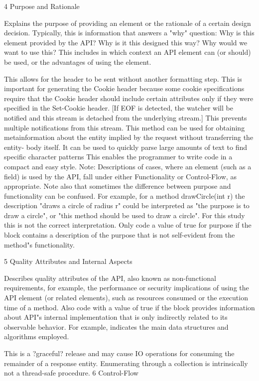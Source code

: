 4 Purpose and Rationale

Explains the purpose of providing an element or the rationale of a certain design decision. Typically, this is information that answers a "why" question: Why is this element provided by the API? Why is it this designed this way? Why would we want to use this? This includes in which context an API element can (or should) be used, or the advantages of using the element.

This allows for the header to be sent without another formatting step.
This is important for generating the Cookie header because some cookie specifications require that the Cookie header should include certain attributes only if they were specified in the Set-Cookie header.
[If EOF is detected, the watcher will be notified and this stream is detached from the underlying stream.] This prevents multiple notifications from this stream.
This method can be used for obtaining metainformation about the entity implied by the request without transferring the entity- body itself.
It can be used to quickly parse large amounts of text to find specific character patterns
This enables the programmer to write code in a compact and easy style.
Note: Descriptions of cases, where an element (such as a field) is used by the API, fall under either Functionality or Control-Flow, as appropriate. Note also that sometimes the difference between purpose and functionality can be confused. For example, for a method drawCircle(int r) the description "draws a circle of radius r" could be interpreted as "the purpose is to draw a circle", or "this method should be used to draw a circle". For this study this is not the correct interpretation. Only code a value of true for purpose if the block contains a description of the purpose that is not self-evident from the method"s functionality.

5 Quality Attributes and Internal Aspects

Describes quality attributes of the API, also known as non-functional requirements, for example, the performance or security implications of using the API element (or related elements), such as resources consumed or the execution time of a method. Also code with a value of true if the block provides information about API"s internal implementation that is only indirectly related to its observable behavior. For example, indicates the main data structures and algorithms employed.

This is a ?graceful? release and may cause IO operations for consuming the remainder of a response entity.
Enumerating through a collection is intrinsically not a thread-safe procedure.
6 Control-Flow


